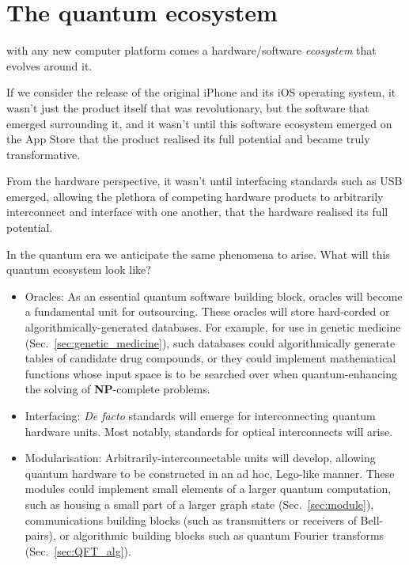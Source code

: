 %
%

\section{The quantum ecosystem}

 with any new computer platform comes a hardware/software \textit{ecosystem} that evolves around it.

If we consider the release of the original iPhone and its iOS operating system, it wasn't just the product itself that was revolutionary, but the software that emerged surrounding it, and it wasn't until this software ecosystem emerged on the App Store that the product realised its full potential and became truly transformative.

From the hardware perspective, it wasn't until interfacing standards such as USB emerged, allowing the plethora of competing hardware products to arbitrarily interconnect and interface with one another, that the hardware realised its full potential.

In the quantum era we anticipate the same phenomena to arise. What will this quantum ecosystem look like?

\begin{itemize}
\item Oracles: As an essential quantum software building block, oracles will become a fundamental unit for outsourcing. These oracles will store hard-corded or algorithmically-generated databases. For example, for use in genetic medicine (Sec.~\ref{sec:genetic_medicine}), such databases could algorithmically generate tables of candidate drug compounds, or they could implement mathematical functions whose input space is to be searched over when quantum-enhancing the solving of \textbf{NP}-complete problems.
\item Interfacing: \textit{De facto} standards will emerge for interconnecting quantum hardware units. Most notably, standards for optical interconnects will arise.
\item Modularisation: Arbitrarily-interconnectable units will develop, allowing quantum hardware to be constructed in an ad hoc, Lego-like manner. These modules could implement small elements of a larger quantum computation, such as housing a small part of a larger graph state (Sec.~\ref{sec:module}), communications building blocks (such as transmitters or receivers of Bell-pairs), or algorithmic building blocks such as quantum Fourier transforms (Sec.~\ref{sec:QFT_alg}).
\end{itemize}

